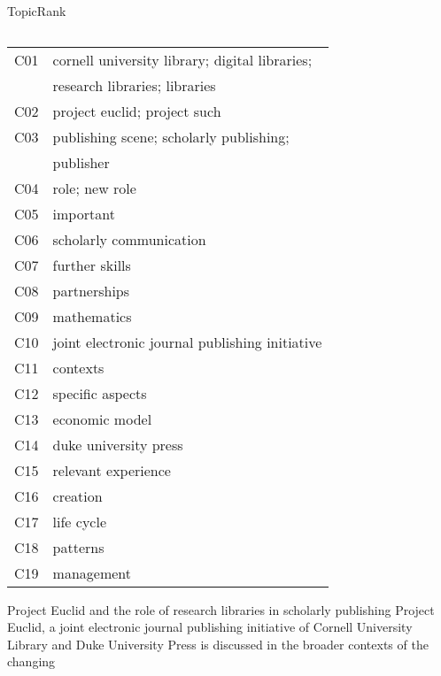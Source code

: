 \begin{frame}{TopicRank}
\begin{columns}
\begin{column}{.55\textwidth}
{{{\begin{tabular}{cl}
                \midrule
                \multirow{1}{*}{C01} & cornell university library; digital libraries;\\
                & research libraries; libraries\\
                C02 & project euclid; project such\\
                \multirow{1}{*}{C03} & publishing scene; scholarly publishing;\\
                & publisher\\
                C04 & role; new role\\
                C05 & important\\
                C06 & scholarly communication\\
                C07 & further skills\\
                C08 & partnerships\\
                C09 & mathematics\\
                C10 & joint electronic journal publishing initiative\\
                C11 & contexts\\
                C12 & specific aspects\\
                C13 & economic model\\
                C14 & duke university press\\
                C15 & relevant experience\\
                C16 & creation\\
                C17 & life cycle\\
                C18 & patterns\\
                C19 & management\\
                \bottomrule
              \end{tabular}
            }
          }{ %
            \begin{exampleblock}{\footnotesize \textcolor{BrickRed}{Project
                                 Euclid} and the \textcolor{BrickRed}{role} of
                                \textcolor{BrickRed}{research libraries} in
                                \textcolor{BrickRed}{scholarly publishing}}
              \footnotesize \textcolor{BrickRed}{Project Euclid}, a
              \textcolor{BrickRed}{joint electronic journal publishing
              initiative} of \textcolor{BrickRed}{Cornell University Library}
              and \textcolor{BrickRed}{Duke University Press} is discussed in
              the broader \textcolor{BrickRed}{contexts} of the changing

\end{exampleblock}}}
\end{column}
\end{columns}
\end{frame}
